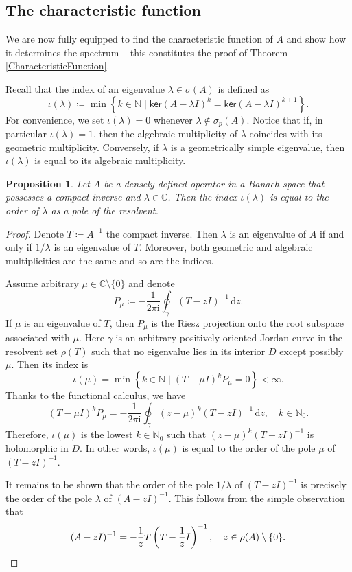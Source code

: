 \documentclass[11pt, a4paper,reqno]{amsart}
\theoremstyle{plain}
\newtheorem{proposition}[theorem]{Proposition}
\theoremstyle{definition}
\theoremstyle{remark}
\newcommand{\dd}{\,\textrm{d}}
\newcommand{\1}{\mathds 1}
\renewcommand{\ker}{\mathsf{ker}}
\begin{document}
\subsection{The characteristic function}
We are now fully equipped to find the characteristic function of $A$ and show how it determines the spectrum -- this constitutes the proof of Theorem \ref{CharacteristicFunction}. 

Recall that the index of an eigenvalue $\lambda \in \sigma(A)$ is defined as
\[
\iota(\lambda) \coloneqq \min \left\{k \in \mathbb N \mid \ker (A-\lambda I)^k = \ker (A-\lambda I)^{k+1}\right\}.
\]
For convenience, we set $\iota(\lambda) = 0$ whenever $\lambda \notin \sigma_p(A)$.  Notice that if, in particular $\iota(\lambda) = 1$, then the algebraic multiplicity of $\lambda$ coincides with its geometric multiplicity. Conversely, if $\lambda$ is a geometrically simple eigenvalue, then $\iota(\lambda)$ is equal to its algebraic multiplicity.

\begin{proposition}\label{IndexPole}
    Let $A$ be a densely defined operator in a Banach space that possesses a compact inverse and $\lambda \in \mathbb C$. Then the index $\iota(\lambda)$ is equal to the order of $\lambda$ as a pole of the resolvent.
\end{proposition}
\begin{proof}
    Denote $T \coloneqq A^{-1}$ the compact inverse. Then $\lambda$ is an eigenvalue of $A$ if and only if $1/\lambda$ is an eigenvalue of $T$. Moreover, both geometric and algebraic multiplicities are the same and so are the indices. \cite[Theorem 9.2.3]  {EdmundsEvans}

    Assume arbitrary $\mu \in \mathbb C \setminus \{0\}$ and denote
    \[
    P_\mu \coloneqq -\frac{1}{2\pi \mathrm{i}}\oint_\gamma(T-zI)^{-1}\dd z.
    \]
    If $\mu$ is an eigenvalue of $T$, then $P_\mu$ is the Riesz projection onto the root subspace associated with $\mu$. Here $\gamma$ is an arbitrary positively oriented Jordan curve in the resolvent set $\rho(T)$ such that no eigenvalue lies in its interior $D$ except possibly $\mu$. Then its index is 
    \[
    \iota(\mu) = \min\left\{k \in \mathbb N \mid (T-\mu I)^k P_\mu = 0\right\} < \infty.
    \]
    Thanks to the functional calculus, we have
    \[
    (T-\mu I)^kP_\mu = - \frac{1}{2\pi \mathrm{i}}\oint_\gamma (z-\mu)^k(T-zI)^{-1} \dd z, \quad k \in \mathbb N_0.
    \]
    Therefore, $\iota(\mu)$ is the lowest $k \in \mathbb N_0$ such that $(z-\mu)^k(T-zI)^{-1}$ is holomorphic in $D$. In other words, $\iota(\mu)$ is equal to the order of the pole $\mu$ of $(T-zI)^{-1}$.

    It remains to be shown that the order of the pole $1/\lambda$ of $(T-zI)^{-1}$ is precisely the order of the pole $\lambda$ of $(A-zI)^{-1}$. This follows from the simple observation that
    \[
    (A-zI)^{-1} = -\frac{1}{z}T\left(T-\frac{1}{z} I\right)^{-1}, \quad z \in \rho(A) \setminus \{0\}. \qedhere
    \]

\end{proof}
\end{document}
